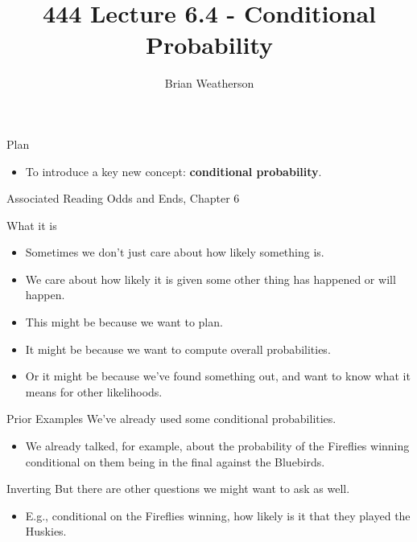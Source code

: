 \documentclass[
  ignorenonframetext,
]{beamer}
\title{444 Lecture 6.4 - Conditional Probability}
\author{Brian Weatherson}
\date{}
\providecommand{\tightlist}{%
  \setlength{\itemsep}{0pt}\setlength{\parskip}{0pt}}
\begin{document}
\frame{\titlepage}

\begin{frame}{Plan}
\protect\hypertarget{plan}{}
\begin{itemize}
\tightlist
\item
  To introduce a key new concept: \textbf{conditional probability}.
\end{itemize}
\end{frame}

\begin{frame}{Associated Reading}
\protect\hypertarget{associated-reading}{}
Odds and Ends, Chapter 6
\end{frame}

\begin{frame}{What it is}
\protect\hypertarget{what-it-is}{}
\begin{itemize}
\tightlist
\item
  Sometimes we don't just care about how likely something is.
\item
  We care about how likely it is given some other thing has happened or
  will happen. \pause
\item
  This might be because we want to plan. \pause
\item
  It might be because we want to compute overall probabilities. \pause
\item
  Or it might be because we've found something out, and want to know
  what it means for other likelihoods.
\end{itemize}
\end{frame}

\begin{frame}{Prior Examples}
\protect\hypertarget{prior-examples}{}
We've already used some conditional probabilities.

\begin{itemize}
\tightlist
\item
  We already talked, for example, about the probability of the Fireflies
  winning conditional on them being in the final against the Bluebirds.
\end{itemize}
\end{frame}

\begin{frame}{Inverting}
\protect\hypertarget{inverting}{}
But there are other questions we might want to ask as well.

\begin{itemize}[<+->]
\tightlist
\item
  E.g., conditional on the Fireflies winning, how likely is it that they
  played the Huskies.
\end{itemize}
\end{frame}
\end{document}
